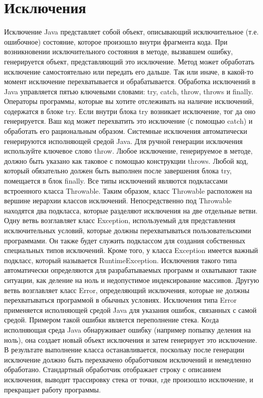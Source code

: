 \section{Исключения}
Исключение Java представляет собой объект, описывающий исключительное (т.е. ошибочное) состояние, которое произошло внутри фрагмента кода. При возникновении исключительного состояния в методе, вызвавшем ошибку, генерируется объект, представляющий это исключение. Метод может обработать исключение самостоятельно или передать его дальше. Так или иначе, в какой-то момент исключение перехватывается и обрабатывается. Обработка исключений в Java управляется пятью ключевыми словами: try, catch, throw, throws и finally. Операторы программы, которые вы хотите отслеживать на наличие исключений, содержатся в блоке try. Если внутри блока try возникает исключение, тог да оно генерируется. Ваш код может перехватить это исключение (с помощью catch) и обработать его рациональным образом. Системные исключения автоматически генерируются исполняющей средой Java. Для ручной генерации исключения используйте ключевое слово throw. Любое исключение, генерируемое в методе, должно быть указано как таковое с помощью конструкции throws. Любой код, который обязательно должен быть выполнен после завершения блока try, помещается в блок finally. Все типы исключений являются подклассами встроенного класса Throwable. Таким образом, класс Throwable расположен на вершине иерархии классов исключений. Непосредственно под Throwable находятся два подкласса, которые разделяют исключения на две отдельные ветви. Одну ветвь возглавляет класс Exception, используемый для представления исключительных условий, которые должны перехватываться пользовательскими программами. Он также будет служить подклассом для создания собственных специальных типов исключений. Кроме того, у класса Exception имеется важный подкласс, который называется RuntimeException. Исключения такого типа автоматически определяются для разрабатываемых программ и охватывают такие ситуации, как деление на ноль и недопустимое индексирование массивов. Другую ветвь возглавляет класс Error, определяющий исключения, которые не должны перехватываться программой в обычных условиях. Исключения типа Error применяется исполняющей средой Java для указания ошибок, связанных с самой средой. Примером такой ошибки является переполнение стека. Коrда исполняющая среда Java обнаруживает ошибку (например попыпку деления на ноль), она создает новый объект исключения и затем генерирует это исключение. В результате выполнение класса останавливается, поскольку после генерации исключение должно быть перехвачено обработчиком исключений и немедленно обработано. Стандартный обработчик отображает строку с описанием исключения, выводит трассировку стека от точки, rде произошло исключение, и прекращает работу программы. \\
